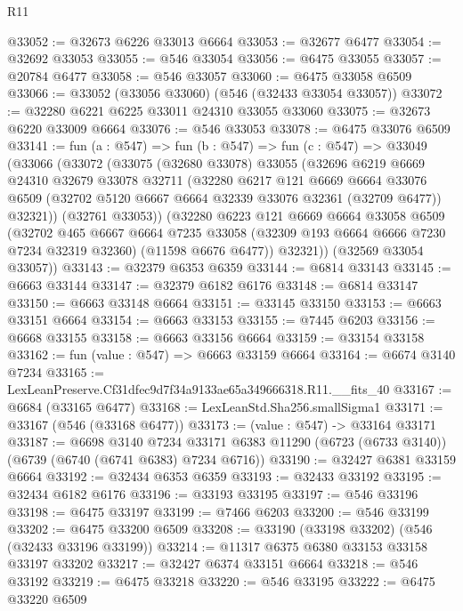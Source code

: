 \begin{lexlean}{R11}
\begin{coremodule}
@33052 := @32673 @6226 @33013 @6664
@33053 := @32677 @6477
@33054 := @32692 @33053
@33055 := @546 @33054
@33056 := @6475 @33055
@33057 := @20784 @6477
@33058 := @546 @33057
@33060 := @6475 @33058 @6509
@33066 := @33052 (@33056 @33060) (@546 (@32433 @33054 @33057))
@33072 := @32280 @6221 @6225 @33011 @24310 @33055 @33060
@33075 := @32673 @6220 @33009 @6664
@33076 := @546 @33053
@33078 := @6475 @33076 @6509
@33141 := fun (a : @547) =>
  fun (b : @547) =>
  fun (c : @547) =>
  @33049
    (@33066
      (@33072
        (@33075
          (@32680 @33078)
          @33055
          (@32696
            @6219
            @6669
            @24310
            @32679
            @33078
            @32711
            (@32280
              @6217
              @121
              @6669
              @6664
              @33076
              @6509
              (@32702 @5120 @6667 @6664 @32339 @33076 @32361 (@32709 @6477))
              @32321))
          (@32761 @33053))
        (@32280
          @6223
          @121
          @6669
          @6664
          @33058
          @6509
          (@32702
            @465
            @6667
            @6664
            @7235
            @33058
            (@32309 @193 @6664 @6666 @7230 @7234 @32319 @32360)
            (@11598 @6676 @6477))
          @32321))
      (@32569 @33054 @33057))
@33143 := @32379 @6353 @6359
@33144 := @6814 @33143
@33145 := @6663 @33144
@33147 := @32379 @6182 @6176
@33148 := @6814 @33147
@33150 := @6663 @33148 @6664
@33151 := @33145 @33150
@33153 := @6663 @33151 @6664
@33154 := @6663 @33153
@33155 := @7445 @6203
@33156 := @6668 @33155
@33158 := @6663 @33156 @6664
@33159 := @33154 @33158
@33162 := fun (value : @547) => @6663 @33159 @6664
@33164 := @6674 @3140 @7234
@33165 := LexLeanPreserve.Cf31dfec9d7f34a9133ae65a349666318.R11.__fits_40
@33167 := @6684 (@33165 @6477)
@33168 := LexLeanStd.Sha256.smallSigma1
@33171 := @33167 (@546 (@33168 @6477))
@33173 := (value : @547) -> @33164 @33171
@33187 := @6698
    @3140
    @7234
    @33171
    @6383
    @11290
    (@6723 (@6733 @3140))
    (@6739 (@6740 (@6741 @6383) @7234 @6716))
@33190 := @32427 @6381 @33159 @6664
@33192 := @32434 @6353 @6359
@33193 := @32433 @33192
@33195 := @32434 @6182 @6176
@33196 := @33193 @33195
@33197 := @546 @33196
@33198 := @6475 @33197
@33199 := @7466 @6203
@33200 := @546 @33199
@33202 := @6475 @33200 @6509
@33208 := @33190 (@33198 @33202) (@546 (@32433 @33196 @33199))
@33214 := @11317 @6375 @6380 @33153 @33158 @33197 @33202
@33217 := @32427 @6374 @33151 @6664
@33218 := @546 @33192
@33219 := @6475 @33218
@33220 := @546 @33195
@33222 := @6475 @33220 @6509

\end{coremodule}
\end{lexlean}
